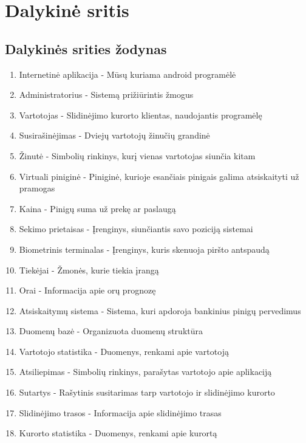 \documentclass[oneside]{VUMIFPSkursinis}
\begin{document}
\begin{enumerate}
\end{enumerate}


\pagebreak





\section{Dalykinė sritis}
\subsection{Dalykinės srities žodynas}

\begin{enumerate}
	\item Internetinė aplikacija - Mūsų kuriama android programėlė
	\item Administratorius - Sistemą prižiūrintis žmogus
	\item Vartotojas - Slidinėjimo kurorto klientas, naudojantis programėlę
	\item Susirašinėjimas - Dviejų vartotojų žinučių grandinė
	\item Žinutė - Simbolių rinkinys, kurį vienas vartotojas siunčia kitam
	\item Virtuali piniginė - Piniginė, kurioje esančiais pinigais galima atsiskaityti už pramogas
	\item Kaina - Pinigų suma už prekę ar paslaugą
	\item Sekimo prietaisas - Įrenginys, siunčiantis savo poziciją sistemai
	\item Biometrinis terminalas - Įrenginys, kuris skenuoja piršto antspaudą
	\item Tiekėjai - Žmonės, kurie tiekia įrangą
	\item Orai - Informacija apie orų prognozę
	\item Atsiskaitymų sistema - Sistema, kuri apdoroja bankinius pinigų pervedimus
	\item Duomenų bazė - Organizuota duomenų struktūra
	\item Vartotojo statistika - Duomenys, renkami apie vartotoją
	\item Atsiliepimas - Simbolių rinkinys, parašytas vartotojo apie aplikaciją
	\item Sutartys - Rašytinis susitarimas tarp vartotojo ir slidinėjimo kurorto
	\item Slidinėjimo trasos - Informacija apie slidinėjimo trasas
	\item Kurorto statistika - Duomenys, renkami apie kurortą
\end{enumerate}
\pagebreak
\end{document}
